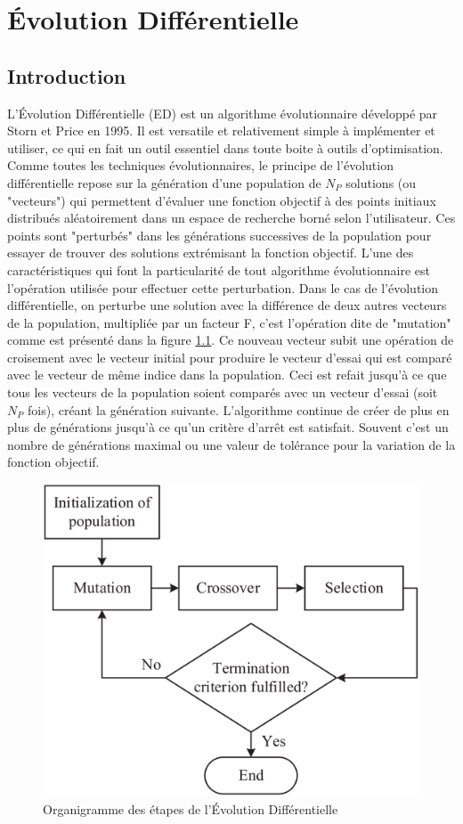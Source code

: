 \chapter{Évolution Différentielle}

\section{Introduction}

L'Évolution Différentielle (ED) est un algorithme évolutionnaire développé par Storn et Price \cite{Storn1995} en 1995. Il est versatile et relativement simple à implémenter et utiliser, ce qui en fait un outil essentiel dans toute boite à outils d'optimisation. Comme toutes les techniques évolutionnaires, le principe de l'évolution différentielle repose sur la génération d'une population de $N_P$ solutions (ou "vecteurs") qui permettent d'évaluer une fonction objectif à des points initiaux distribués aléatoirement dans un espace de recherche borné selon l'utilisateur. Ces points sont "perturbés" dans les générations successives de la population pour essayer de trouver des solutions extrémisant la fonction objectif. L'une des caractéristiques qui font la particularité de tout algorithme évolutionnaire est l'opération utilisée pour effectuer cette perturbation. Dans le cas de l'évolution différentielle, on perturbe une solution avec la différence de deux autres vecteurs de la population, multipliée par un facteur F, c'est l'opération dite de "mutation" comme est présenté dans la figure \ref{fig:deflowchart}. Ce nouveau vecteur subit une opération de croisement avec le vecteur initial pour produire le vecteur d'essai qui est comparé avec le vecteur de même indice dans la population. Ceci est refait jusqu'à ce que tous les vecteurs de la population soient comparés avec un vecteur d'essai (soit $N_P$ fois), créant la génération suivante. L'algorithme continue de créer de plus en plus de générations jusqu'à ce qu'un critère d'arrêt est satisfait. Souvent c'est un nombre de générations maximal ou une valeur de tolérance pour la variation de la fonction objectif.

\begin{figure}[H]
  \begin{center}
    \includegraphics[width=.6\textwidth]{resources/DE.png}
    \caption{Organigramme des étapes de l'Évolution Différentielle \cite{Chin2019}}
    \label{fig:deflowchart}
  \end{center}
\end{figure}

